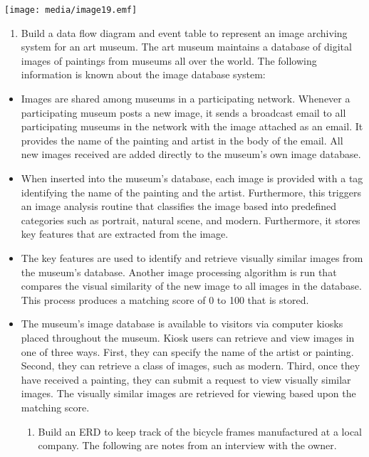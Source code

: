 \texttt{[image: media/image19.emf]}

\begin{enumerate}
\def\labelenumi{\arabic{enumi}.}
\setcounter{enumi}{4}
\item
  Build a data flow diagram and event table to represent an image
  archiving system for an art museum. The art museum maintains a
  database of digital images of paintings from museums all over the
  world. The following information is known about the image database
  system:
\end{enumerate}

\begin{itemize}
\item
  Images are shared among museums in a participating network. Whenever a
  participating museum posts a new image, it sends a broadcast email to
  all participating museums in the network with the image attached as an
  email. It provides the name of the painting and artist in the body of
  the email. All new images received are added directly to the museum's
  own image database.
\item
  When inserted into the museum's database, each image is provided with
  a tag identifying the name of the painting and the artist.
  Furthermore, this triggers an image analysis routine that classifies
  the image based into predefined categories such as portrait, natural
  scene, and modern. Furthermore, it stores key features that are
  extracted from the image.
\item
  The key features are used to identify and retrieve visually similar
  images from the museum's database. Another image processing algorithm
  is run that compares the visual similarity of the new image to all
  images in the database. This process produces a matching score of 0 to
  100 that is stored.
\item
  The museum's image database is available to visitors via computer
  kiosks placed throughout the museum. Kiosk users can retrieve and view
  images in one of three ways. First, they can specify the name of the
  artist or painting. Second, they can retrieve a class of images, such
  as modern. Third, once they have received a painting, they can submit
  a request to view visually similar images. The visually similar images
  are retrieved for viewing based upon the matching score.

  \begin{enumerate}
  \def\labelenumi{\arabic{enumi}.}
  \item
    Build an ERD to keep track of the bicycle frames manufactured at a
    local company. The following are notes from an interview with the
    owner.
  \end{enumerate}
\end{itemize}

